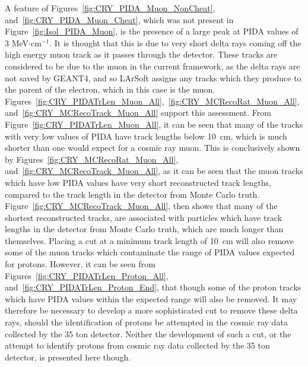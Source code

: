 A feature of Figures~\ref{fig:CRY_PIDA_Muon_NonCheat}, and~\ref{fig:CRY_PIDA_Muon_Cheat}, which was not present in Figure~\ref{fig:Isol_PIDA_Muon}, is the presence of a large peak at PIDA values of 3 MeV$\cdot$cm$^{-1}$. It is thought that this is due to very short delta rays coming off the high energy muon track as it passes through the detector. These tracks are considered to be due to the muon in the current framework, as the delta rays are not saved by GEANT4, and so LArSoft assigns any tracks which they produce to the parent of the electron, which in this case is the muon. Figures~\ref{fig:CRY_PIDATrLen_Muon_All},~\ref{fig:CRY_MCRecoRat_Muon_All}, and~\ref{fig:CRY_MCRecoTrack_Muon_All} support this assessment. From Figure~\ref{fig:CRY_PIDATrLen_Muon_All}, it can be seen that many of the tracks with very low values of PIDA have track lengths below 10~cm, which is much shorter than one would expect for a cosmic ray muon. This is conclusively shown by Figures~\ref{fig:CRY_MCRecoRat_Muon_All}, and~\ref{fig:CRY_MCRecoTrack_Muon_All}, as it can be seen that the muon tracks which have low PIDA values have very short reconstructed track lengths, compared to the track length in the detector from Monte Carlo truth. Figure~\ref{fig:CRY_MCRecoTrack_Muon_All}, then shows that many of the shortest reconstructed tracks, are associated with particles which have track lengths in the detector from Monte Carlo truth, which are much longer than themselves. Placing a cut at a minimum track length of 10~cm will also remove some of the muon tracks which contaminate the range of PIDA values expected for protons. However, it can be seen from Figures~\ref{fig:CRY_PIDATrLen_Proton_All}, and~\ref{fig:CRY_PIDATrLen_Proton_End}, that though some of the proton tracks which have PIDA values within the expected range will also be removed. It may therefore be necessary to develop a more sophisticated cut to remove these delta rays, should the identification of protons be attempted in the cosmic ray data collected by the 35 ton detector. Neither the development of such a cut, or the attempt to identify protons from cosmic ray data collected by the 35 ton detector, is presented here though. \\

